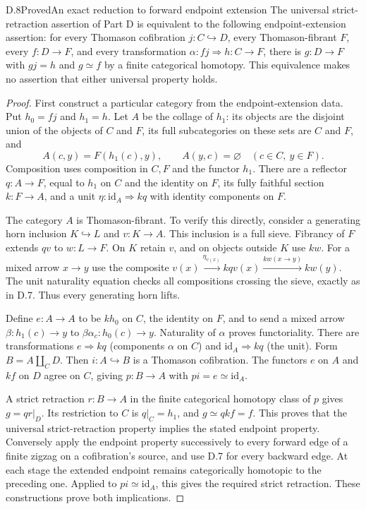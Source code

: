 \begin{claim}{D.8}{Proved}{An exact reduction to forward endpoint extension}
The universal strict-retraction assertion of Part D is equivalent to the following endpoint-extension assertion: for every Thomason cofibration $j:C\hookrightarrow D$, every Thomason-fibrant $F$, every $f:D\to F$, and every transformation $\alpha:fj\Rightarrow h:C\to F$, there is $g:D\to F$ with $gj=h$ and $g\simeq f$ by a finite categorical homotopy. This equivalence makes no assertion that either universal property holds.
\end{claim}
\begin{proof}
First construct a particular category from the endpoint-extension data. Put $h_0=fj$ and $h_1=h$. Let $A$ be the collage of $h_1$: its objects are the disjoint union of the objects of $C$ and $F$, its full subcategories on these sets are $C$ and $F$, and
\[
 A(c,y)=F(h_1(c),y),\qquad A(y,c)=\varnothing
 \quad(c\in C,\ y\in F).
\]
Composition uses composition in $C,F$ and the functor $h_1$. There are a reflector $q:A\to F$, equal to $h_1$ on $C$ and the identity on $F$, its fully faithful section $k:F\to A$, and a unit $\eta:\mathrm{id}_A\Rightarrow kq$ with identity components on $F$.

The category $A$ is Thomason-fibrant. To verify this directly, consider a generating horn inclusion $K\hookrightarrow L$ and $v:K\to A$. This inclusion is a full sieve. Fibrancy of $F$ extends $qv$ to $w:L\to F$. On $K$ retain $v$, and on objects outside $K$ use $kw$. For a mixed arrow $x\to y$ use the composite
$ v(x)\xrightarrow{\eta_{v(x)}}kqv(x)\xrightarrow{kw(x\to y)}kw(y)$.
The unit naturality equation checks all compositions crossing the sieve, exactly as in D.7. Thus every generating horn lifts.

Define $e:A\to A$ to be $kh_0$ on $C$, the identity on $F$, and to send a mixed arrow $\beta:h_1(c)\to y$ to $\beta\alpha_c:h_0(c)\to y$. Naturality of $\alpha$ proves functoriality. There are transformations $e\Rightarrow kq$ (components $\alpha$ on $C$) and $\mathrm{id}_A\Rightarrow kq$ (the unit). Form
$B=A\amalg_C D$. Then $i:A\hookrightarrow B$ is a Thomason cofibration. The functors $e$ on $A$ and $kf$ on $D$ agree on $C$, giving $p:B\to A$ with $pi=e\simeq\mathrm{id}_A$.

A strict retraction $r:B\to A$ in the finite categorical homotopy class of $p$ gives $g=qr|_D$. Its restriction to $C$ is $q|_C=h_1$, and $g\simeq qk f=f$. This proves that the universal strict-retraction property implies the stated endpoint property. Conversely apply the endpoint property successively to every forward edge of a finite zigzag on a cofibration's source, and use D.7 for every backward edge. At each stage the extended endpoint remains categorically homotopic to the preceding one. Applied to $pi\simeq\mathrm{id}_A$, this gives the required strict retraction. These constructions prove both implications.
\end{proof}

